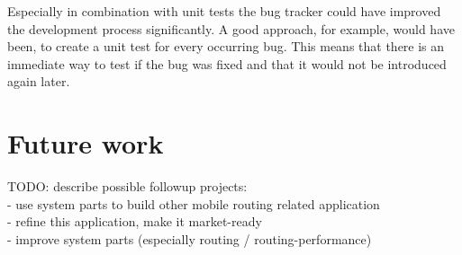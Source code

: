 Especially in combination with unit tests the bug tracker could have
improved the development process significantly. A good approach, for
example, would have been, to create a unit test for every occurring bug.
This means that there is an immediate way to test if the bug was
fixed and that it would not be introduced again later.

\section{Future work}
TODO: describe possible followup projects:\\
- use system parts to build other mobile routing related application\\
- refine this application, make it market-ready\\
- improve system parts (especially routing / routing-performance)\\
